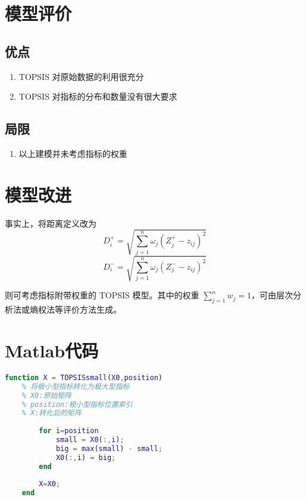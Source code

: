 \documentclass[withoutpreface]{cumcmthesis}
\begin{document}
    \section{模型评价}

    \subsection{优点}
    \begin{enumerate}
        \item TOPSIS 对原始数据的利用很充分
        \item TOPSIS 对指标的分布和数量没有很大要求
    \end{enumerate}

    \subsection{局限}
    \begin{enumerate}
        \item 以上建模并未考虑指标的权重
    \end{enumerate}

    \section{模型改进}

    事实上，将距离定义改为
    $$D_i^+=\sqrt{\sum\limits_{j=1}^{n}\omega_j (Z_j^+-z_{ij})^2}$$
    $$D_i^-=\sqrt{\sum\limits_{j=1}^{n}\omega_j (Z_j^--z_{ij})^2}$$

    则可考虑指标附带权重的 TOPSIS 模型。其中的权重 $\sum\limits_{j=1}^{n} w_j=1$，可由层次分析法或熵权法等评价方法生成。

    \appendix

    \section{Matlab代码}
    \begin{lstlisting}[language=matlab,caption={TOPSISsmall.m}]
    function X = TOPSISsmall(X0,position)
    % 将极小型指标转化为极大型指标
    % X0:原始矩阵
    % position:极小型指标位置索引
    % X:转化后的矩阵
    
        for i=position
            small = X0(:,i);
            big = max(small) - small;
            X0(:,i) = big;
        end
        
        X=X0;
    end
    \end{lstlisting}
\end{document}
